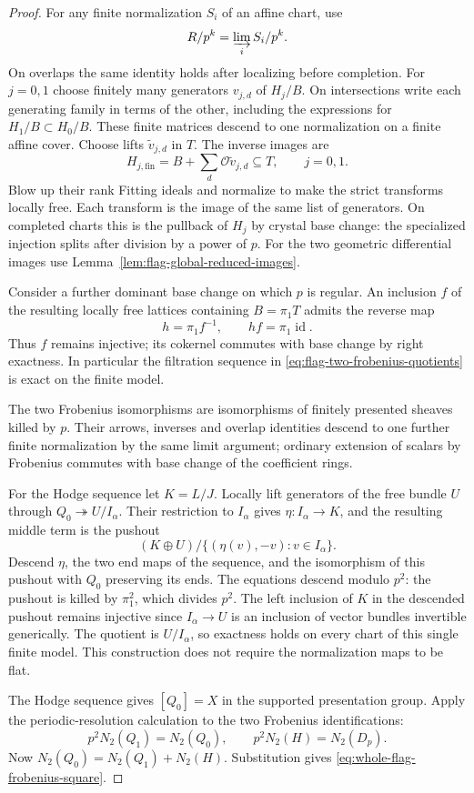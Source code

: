 \begin{proof}
For any finite normalization \(S_i\) of an affine chart, use
\[
   R/p^k=\varinjlim_i S_i/p^k .
\]
On overlaps the same identity holds after localizing before
completion. For \(j=0,1\) choose finitely many generators \(v_{j,d}\)
of \(H_j/B\). On intersections write each generating family in terms
of the other, including the expressions for \(H_1/B\subset H_0/B\).
These finite matrices descend to one normalization on a finite affine
cover. Choose lifts \(\widetilde v_{j,d}\) in \(T\). The inverse images are
\[
        H_{j,\mathrm{fin}}=B+\sum_d\mathcal O\widetilde v_{j,d}
                     \subseteq T,\qquad j=0,1 .
\]
Blow up their rank Fitting ideals and normalize to make the strict
transforms locally free. Each transform is the image of the same
list of generators. On completed charts this is the pullback of
\(H_j\) by crystal base change: the specialized injection splits
after division by a power of \(p\). For the two geometric differential
images use Lemma~\ref{lem:flag-global-reduced-images}.

Consider a further dominant base change on which \(p\) is regular.
An inclusion \(f\) of the resulting locally free lattices containing
\(B=\pi_1 T\) admits the reverse map
\[
                   h=\pi_1 f^{-1},\qquad hf=\pi_1\operatorname{id}.
\]
Thus \(f\) remains injective; its cokernel commutes with base change
by right exactness. In particular the filtration sequence in
\eqref{eq:flag-two-frobenius-quotients} is exact on the finite model.

The two Frobenius isomorphisms are isomorphisms of finitely presented sheaves killed by \(p\). Their arrows, inverses and overlap identities descend to one further finite normalization by the same limit argument; ordinary extension of scalars by Frobenius commutes with base change of the coefficient rings. 

For the Hodge sequence let \(K=L/J\). Locally lift generators of the free bundle \(U\) through \(Q_0\twoheadrightarrow U/I_\alpha\). Their restriction to \(I_\alpha\) gives \(\eta:I_\alpha\to K\), and the resulting middle term is the pushout
\[
       (K\oplus U)/\{(\eta(v),-v):v\in I_\alpha\}.
\]
Descend \(\eta\), the two end maps of the sequence, and the isomorphism of this pushout with \(Q_0\) preserving its ends. The equations descend modulo \(p^2\): the pushout is killed by \(\pi_1^2\), which divides \(p^2\). The left inclusion of \(K\) in the descended pushout remains injective since \(I_\alpha\to U\) is an inclusion of vector bundles invertible generically. The quotient is \(U/I_\alpha\), so exactness holds on every chart of this single finite model. This construction does not require the normalization maps to be flat.

The Hodge sequence gives \([Q_0]=X\) in the supported presentation
group. Apply the periodic-resolution calculation to the two
Frobenius identifications:
\[
      p^2 N_2(Q_1)=N_2(Q_0),\qquad p^2 N_2(H)=N_2(D_p).
\]
Now \(N_2(Q_0)=N_2(Q_1)+N_2(H)\). Substitution gives
\eqref{eq:whole-flag-frobenius-square}.

\end{proof}

